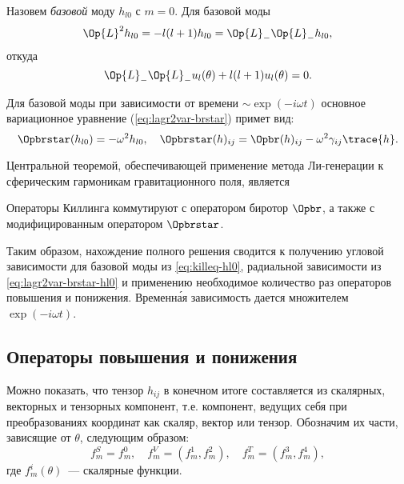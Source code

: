 \documentclass[\docroot/reports/draft/report.tex]{subfiles}
\begin{document}
    Назовем \textit{базовой} моду $h_{l0}$ с $m = 0$. Для базовой моды
    \begin{equation*}
        \Op{L}^2 h_{l0} = - l(l+1) h_{l0} = \Op{L}_{-}\Op{L}_{-} h_{l0},
    \end{equation*}
    откуда
    \begin{equation}\label{eq:killeq-hl0}
        \Op{L}_{-}\Op{L}_{-} u_l(\theta) + l(l+1) u_l(\theta) = 0.
    \end{equation}

    Для базовой моды при зависимости от времени $\sim\exp(-i\omega t)$ основное вариационное уравнение (\autoref{eq:lagr2var-brstar}) примет вид:
    \begin{equation}\label{eq:lagr2var-brstar-hl0}
        \Opbrstar(h_{l0}) = - \omega^2 h_{l0}, \quad
        \Opbrstar(h)_{ij} = \Opbr(h)_{ij} - \omega^2 \gamma_{ij} \trace{h} .
    \end{equation}

    Центральной теоремой, обеспечивающей применение метода Ли-генерации к сферическим гармоникам гравитационного поля, является
    \begin{theorem}
        Операторы Киллинга коммутируют с оператором биротор $\Opbr$, а также с модифицированным оператором $\Opbrstar$.
    \end{theorem}

    Таким образом, нахождение полного решения сводится к получению угловой зависимости для базовой моды из \autoref{eq:killeq-hl0}, радиальной зависимости из \autoref{eq:lagr2var-brstar-hl0} и применению необходимое количество раз операторов повышения и понижения. Временн\'{а}я зависимость дается множителем $\exp(-i \omega t)$.

\subsection{Операторы повышения и понижения}

    Можно показать, что тензор $h_{ij}$ в конечном итоге составляется из скалярных, векторных и тензорных компонент, т.е. компонент, ведущих себя при преобразованиях координат как скаляр, вектор или тензор. Обозначим их части, зависящие от $\theta$, следующим образом:
    \begin{equation}
        f^S_m = f^0_m, \quad
        f^V_m = (f^1_m,f^2_m), \quad
        f^T_m = (f^3_m,f^4_m) ,
    \end{equation}
    где $f^i_m(\theta)$~--- скалярные функции.
\end{document}
